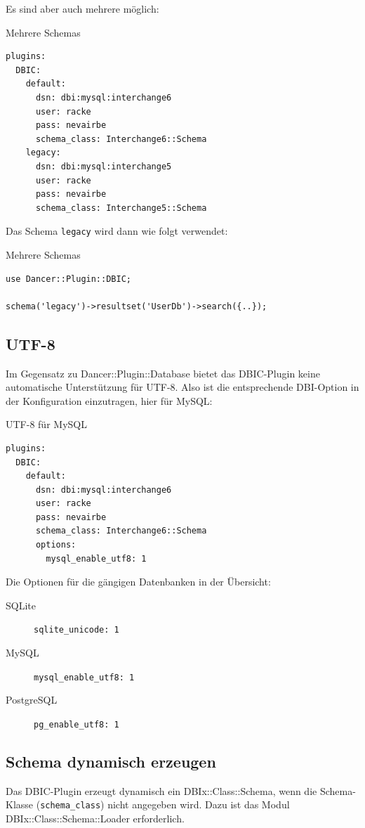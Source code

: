 Es sind aber auch mehrere möglich:

\begin{frame}[fragile]{Mehrere Schemas}
\begin{lstlisting}
plugins:
  DBIC:
    default:
      dsn: dbi:mysql:interchange6
      user: racke
      pass: nevairbe
      schema_class: Interchange6::Schema
    legacy:
      dsn: dbi:mysql:interchange5
      user: racke
      pass: nevairbe
      schema_class: Interchange5::Schema
\end{lstlisting}
\end{frame}

Das Schema \verb|legacy| wird dann wie folgt verwendet:

\begin{frame}[fragile]{Mehrere Schemas}
\begin{lstlisting}
use Dancer::Plugin::DBIC;

schema('legacy')->resultset('UserDb')->search({..});
\end{lstlisting}
\end{frame}

\subsection{UTF-8}
Im Gegensatz zu Dancer::Plugin::Database bietet das DBIC-Plugin
keine automatische Unterstützung für UTF-8. Also ist die entsprechende
DBI-Option in der Konfiguration einzutragen, hier für MySQL:
\begin{frame}[fragile]{UTF-8 für MySQL}
\begin{lstlisting}
plugins:
  DBIC:
    default:
      dsn: dbi:mysql:interchange6
      user: racke
      pass: nevairbe
      schema_class: Interchange6::Schema
      options:
        mysql_enable_utf8: 1
\end{lstlisting}
\end{frame}

Die Optionen für die gängigen Datenbanken in der Übersicht:

\begin{description}
\item[SQLite] \verb|sqlite_unicode: 1|
\item[MySQL] \verb|mysql_enable_utf8: 1|
\item[PostgreSQL] \verb|pg_enable_utf8: 1| 
\end{description}

\subsection{Schema dynamisch erzeugen}
Das DBIC-Plugin erzeugt dynamisch ein DBIx::Class::Schema, wenn
die Schema-Klasse (\verb|schema_class|) nicht angegeben wird.
Dazu ist das Modul DBIx::Class::Schema::Loader erforderlich.

